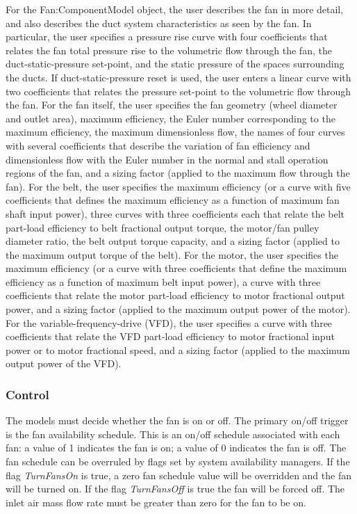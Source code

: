 For the Fan:ComponentModel object, the user describes the fan in more detail, and also describes the duct system characteristics as seen by the fan. In particular, the user specifies a pressure rise curve with four coefficients that relates the fan total pressure rise to the volumetric flow through the fan, the duct-static-pressure set-point, and the static pressure of the spaces surrounding the ducts. If duct-static-pressure reset is used, the user enters a linear curve with two coefficients that relates the pressure set-point to the volumetric flow through the fan. For the fan itself, the user specifies the fan geometry (wheel diameter and outlet area), maximum efficiency, the Euler number corresponding to the maximum efficiency, the maximum dimensionless flow, the names of four curves with several coefficients that describe the variation of fan efficiency and dimensionless flow with the Euler number in the normal and stall operation regions of the fan, and a sizing factor (applied to the maximum flow through the fan). For the belt, the user specifies the maximum efficiency (or a curve with five coefficients that defines the maximum efficiency as a function of maximum fan shaft input power), three curves with three coefficients each that relate the belt part-load efficiency to belt fractional output torque, the motor/fan pulley diameter ratio, the belt output torque capacity, and a sizing factor (applied to the maximum output torque of the belt). For the motor, the user specifies the maximum efficiency (or a curve with three coefficients that define the maximum efficiency as a function of maximum belt input power), a curve with three coefficients that relate the motor part-load efficiency to motor fractional output power, and a sizing factor (applied to the maximum output power of the motor). For the variable-frequency-drive (VFD), the user specifies a curve with three coefficients that relate the VFD part-load efficiency to motor fractional input power or to motor fractional speed, and a sizing factor (applied to the maximum output power of the VFD).

\subsubsection{Control}\label{control}

The models must decide whether the fan is on or off. The primary on/off trigger is the fan availability schedule. This is an on/off schedule associated with each fan: a value of 1 indicates the fan is on; a value of 0 indicates the fan is off. The fan schedule can be overruled by flags set by system availability managers. If the flag \emph{TurnFansOn} is true, a zero fan schedule value will be overridden and the fan will be turned on. If the flag \emph{TurnFansOff} is true the fan will be forced off. The inlet air mass flow rate must be greater than zero for the fan to be on.


